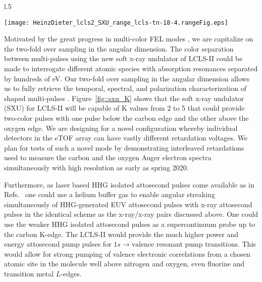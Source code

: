 \begin{wrapfigure}[18]{l}{.5\linewidth}
\vspace{-1\baselineskip}
\centerline{
	\texttt{[image: HeinzDieter\_lcls2\_SXU\_range\_lcls-tn-18-4.rangeFig.eps]}
	}
\vspace{-1\baselineskip}
\caption{\label{fig::sxu_K} Soft x-ray undulator tuning range. \cite{HeinzDieter_SXU_twocolor}
	}
\end{wrapfigure}
Motivated by the great progress in multi-color FEL modes \cite{Lutman13_twocolor,Marinelli13_twocolor,Allaria2014,Marinelli2015,Prince2016,Lutman2016,Marinelli2016,Lutman2016FreshSlice}, we are capitalize on the two-fold over sampling in the angular dimension.
The color separation between multi-pulses using the new soft x-ray undulator of LCLS-II could be made to interrogate different atomic species with absorption resonances separated by hundreds of eV.
Our two-fold over sampling in the angular dimension allows us to fully retrieve the temporal, spectral, and polarization characterization of shaped multi-pulses \cite{Lutman2016,Lutman2016FreshSlice}.
Figure~\ref{fig::sxu_K} shows that the soft x-ray undulator (SXU) for LCLS-II will be capable of K values from 2 to 5 that could provide two-color pulses with one pulse below the carbon edge and the other above the oxygen edge.
We are designing for a novel configuration whereby individual detectors in the eTOF array can have vastly different retardation voltages.
We plan for tests of such a novel mode by demonstrating interleaved retardations used to measure the carbon and the oxygen Auger electron spectra simultaneously with high resolution as early as spring 2020.

Furthermore, as laser based HHG isolated attosecond pulses come available as in Refs.~\cite{Chen2014,Schmidt2016,Biegert2016,WornerSci2017} one could use a helium buffer gas to enable angular streaking simultaneously of HHG-generated EUV attosecond pulses with x-ray attosecond pulses in the identical scheme as the x-ray/x-ray pairs discussed above.
One could use the weaker HHG isolated attosecond pulses \cite{Biegert2016} as a supercontinuum probe up to the carbon K-edge.
The LCLS-II would provide the much higher power and energy attosecond pump pulses for $1s\rightarrow\mbox{valence}$ resonant pump transitions.
This would allow for strong pumping of valence electronic correlations from a chosen atomic site in the molecule well above nitrogen and oxygen, even fluorine and transition metal $L$-edges.

